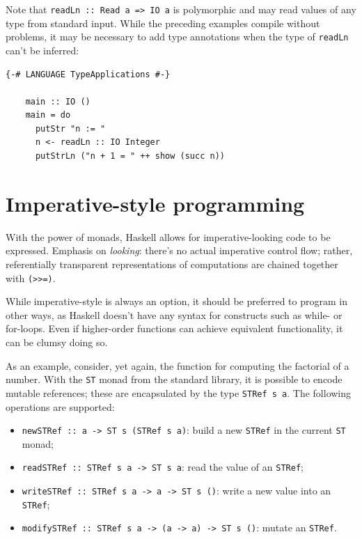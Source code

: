 \documentclass[UdineBachThesis,american,11pt]{PhdThesis}
\begin{document}
  Note that \mbox{\texttt{readLn :: Read a => IO a}} is polymorphic and may read
  values of any type from standard input. While the preceding examples compile
  without problems, it may be necessary to add type annotations when the type of
  \mbox{\texttt{readLn}} can't be inferred:

  \begin{Verbatim}[gobble=4,fontsize=\small]
    {-# LANGUAGE TypeApplications #-}

    main :: IO ()
    main = do
      putStr "n := "
      n <- readLn :: IO Integer
      putStrLn ("n + 1 = " ++ show (succ n))
  \end{Verbatim}

  \section{Imperative-style programming}

  With the power of monads, Haskell allows for imperative-looking code to be
  expressed. Emphasis on \emph{looking}: there's no actual imperative control
  flow; rather, referentially transparent representations of computations are
  chained together with \mbox{\texttt{(>>=)}}.

  While imperative-style is always an option, it should be preferred to program
  in other ways, as Haskell doesn't have any syntax for constructs such as
  while- or for-loops. Even if higher-order functions can achieve equivalent
  functionality, it can be clumsy doing so.

  As an example, consider, yet again, the function for computing the factorial
  of a number. With the \mbox{\texttt{ST}} monad from the standard library, it
  is possible to encode mutable references; these are encapsulated by the type
  \mbox{\texttt{STRef s a}}. The following operations are supported:

  \begin{itemize}
    \item \mbox{\texttt{newSTRef :: a -> ST s (STRef s a)}}: build a new
    \mbox{\texttt{STRef}} in the current \mbox{\texttt{ST}} monad;

    \item \mbox{\texttt{readSTRef :: STRef s a -> ST s a}}: read the value of an
    \mbox{\texttt{STRef}};

    \item \mbox{\texttt{writeSTRef :: STRef s a -> a -> ST s ()}}: write a new
    value into an \mbox{\texttt{STRef}};

    \item \mbox{\texttt{modifySTRef :: STRef s a -> (a -> a) -> ST s ()}}:
    mutate an \mbox{\texttt{STRef}}.
  \end{itemize}
\end{document}
